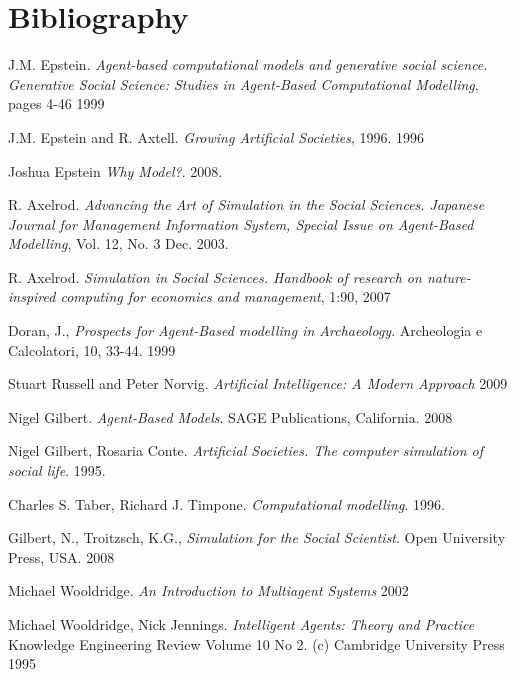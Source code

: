 \documentclass[11pt,oneside,a4paper,openright]{report}
\begin{document}
\chapter{Bibliography}
\begin{thebibliography}{13}

	J.M. Epstein. 
	\emph{Agent-based computational models and generative social science. Generative Social
	Science: Studies in Agent-Based Computational Modelling}, pages 4-46
	1999

	J.M. Epstein and R. Axtell.
	\emph{Growing Artificial Societies}, 1996.
	1996

	Joshua Epstein
	\emph{Why Model?}.
	2008.

	R. Axelrod. 
	\emph{Advancing the Art of Simulation in the Social Sciences. Japanese Journal for Management Information System, Special Issue on Agent-Based Modelling}, Vol. 12, No. 3 
	Dec. 2003. 

	R. Axelrod. 
	\emph{Simulation in Social Sciences. Handbook of research on nature-inspired computing for economics and management}, 1:90, 
	2007

	Doran, J., 
	\emph{Prospects for Agent-Based modelling in Archaeology}. Archeologia e Calcolatori, 10, 33-44.
	1999

	Stuart Russell and Peter Norvig.
	\emph{Artificial Intelligence: A Modern Approach}
	2009

	Nigel Gilbert.
	\emph{Agent-Based Models}. SAGE Publications, California.
	2008

	Nigel Gilbert, Rosaria Conte.
	\emph{Artificial Societies. The computer simulation of social life}.
	1995.

	Charles S. Taber, Richard J. Timpone.
	\emph{Computational modelling}.
	1996.

	Gilbert, N., Troitzsch, K.G.,
	\emph{Simulation for the Social Scientist}. Open University Press, USA.
	2008

	Michael Wooldridge.
	\emph{An Introduction to Multiagent Systems}
	2002

	 Michael Wooldridge, Nick Jennings.
	\emph{Intelligent Agents: Theory and Practice}  Knowledge Engineering Review Volume 10 No 2. (c) Cambridge
	University Press 
	1995


\end{thebibliography}
\end{document}
